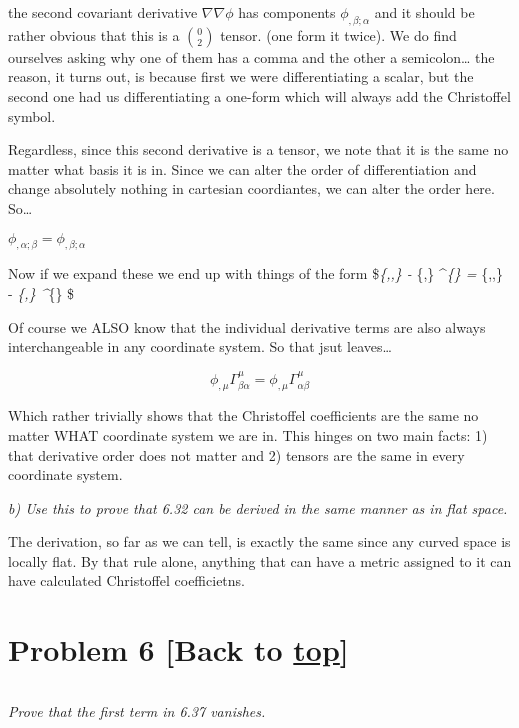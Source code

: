 \documentclass[landscape,letterpaper,10pt,english]{article}
\begin{document}
the second covariant derivative \(\nabla\nabla\phi\) has components
\(\phi_{,\beta ;\alpha}\) and it should be rather obvious that this is a
\(0\choose2\) tensor. (one form it twice). We do find ourselves asking
why one of them has a comma and the other a semicolon\ldots{} the
reason, it turns out, is because first we were differentiating a scalar,
but the second one had us differentiating a one-form which will always
add the Christoffel symbol.

Regardless, since this second derivative is a tensor, we note that it is
the same no matter what basis it is in. Since we can alter the order of
differentiation and change absolutely nothing in cartesian coordiantes,
we can alter the order here. So\ldots{}

\(\phi_{,\alpha;\beta} = \phi_{,\beta;\alpha}\)

Now if we expand these we end up with things of the form
\$\phi\emph{\{,\alpha,\beta\} - \phi}\{,\mu\}
\Gamma\^{}\mu\emph{\{\beta\alpha\} = \phi}\{,\beta,\alpha\} -
\phi\emph{\{,\mu\} \Gamma\^{}\mu}\{\alpha\beta\} \$

Of course we ALSO know that the individual derivative terms are also
always interchangeable in any coordinate system. So that jsut
leaves\ldots{}

\[ \phi_{,\mu} \Gamma^\mu_{\beta\alpha} = \phi_{,\mu} \Gamma^\mu_{\alpha\beta} \]

Which rather trivially shows that the Christoffel coefficients are the
same no matter WHAT coordinate system we are in. This hinges on two main
facts: 1) that derivative order does not matter and 2) tensors are the
same in every coordinate system.

    \emph{b) Use this to prove that 6.32 can be derived in the same manner
as in flat space.}

    The derivation, so far as we can tell, is exactly the same since any
curved space is locally flat. By that rule alone, anything that can have
a metric assigned to it can have calculated Christoffel coefficietns.

    \hypertarget{problem-6-back-to-top}{%
\section{\texorpdfstring{Problem 6 {[}Back to
\hyperref[toc]{top}{]}}{Problem 6 {[}Back to {]}}}\label{problem-6-back-to-top}}

\[\label{P6}\]

\emph{Prove that the first term in 6.37 vanishes.}
\end{document}

